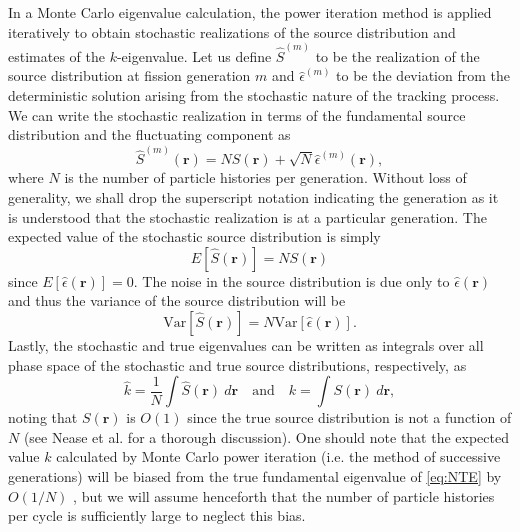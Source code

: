 In a Monte Carlo eigenvalue calculation, the power iteration method is applied
iteratively to obtain stochastic realizations of the source distribution and
estimates of the $k$-eigenvalue. Let us define $\hat{S}^{(m)}$ to be the
realization of the source distribution at fission generation $m$ and
$\hat{\epsilon}^{(m)}$ to be the deviation from the deterministic solution
arising from the stochastic nature of the tracking process. We can write the
stochastic realization in terms of the fundamental source distribution and the
fluctuating component as \cite{ane-brissenden-1986}
\begin{equation}
  \label{eq:source}
  \hat{S}^{(m)}(\mathbf{r})= N S(\mathbf{r}) + \sqrt{N}
  \hat{\epsilon}^{(m)}(\mathbf{r}),
\end{equation}
where $N$ is the number of particle histories per generation. Without loss of
generality, we shall drop the superscript notation indicating the generation as
it is understood that the stochastic realization is at a particular
generation. The expected value of the stochastic source distribution is simply
\begin{equation}
  E \left[ \hat{S}(\mathbf{r})\right] = N S (\mathbf{r})
\end{equation}
since $E \left[ \hat{\epsilon}(\mathbf{r})\right] = 0$. The noise in the source
distribution is due only to $\hat{\epsilon}(\mathbf{r})$ and thus the variance
of the source distribution will be
\begin{equation}
  \text{Var} \left[ \hat{S}(\mathbf{r})\right] = N \text{Var} \left[
    \hat{\epsilon}(\mathbf{r}) \right].
\end{equation}
Lastly, the stochastic and true eigenvalues can be written as integrals over all
phase space of the stochastic and true source distributions, respectively, as
\begin{equation}
  \label{eq:k_to_source}
  \hat{k} = \frac{1}{N} \int \hat{S}(\mathbf{r}) \: d\mathbf{r} \quad \text{and}
  \quad k = \int S(\mathbf{r}) \: d\mathbf{r},
\end{equation}
noting that $S(\mathbf{r})$ is $O(1)$ since the true source distribution is not
a function of $N$ (see Nease et al. \cite{mc-nease-2009} for a thorough
discussion). One should note that the expected value $k$ calculated by Monte
Carlo power iteration (i.e. the method of successive generations) will be biased
from the true fundamental eigenvalue of \eqref{eq:NTE} by $O(1/N)$
\cite{ane-brissenden-1986}, but we will assume henceforth that the number of
particle histories per cycle is sufficiently large to neglect this bias.

